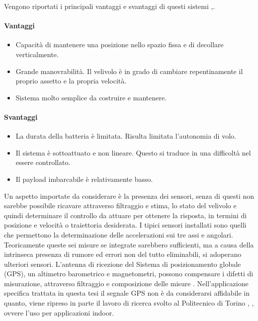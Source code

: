 Vengono riportati i principali vantaggi e svantaggi di questi sistemi \cite{DesTestCarm},\cite{irisquad}.
\paragraph{Vantaggi}
\begin{itemize}
	\item Capacità di mantenere una posizione nello spazio fissa e di decollare verticalmente.
	\item Grande manovrabilità. Il velivolo è in grado di cambiare repentinamente il proprio assetto e la propria velocità.
	\item Sistema molto semplice da costruire e mantenere.
\end{itemize}
\paragraph{Svantaggi}
\begin{itemize}
	\item La durata della batteria è limitata. Risulta limitata l'autonomia di volo.
	\item Il sistema è sottoattuato e non lineare. Questo si traduce in una difficoltà nel essere controllato.
	\item Il payload imbarcabile è relativamente basso.
\end{itemize}

Un aspetto importate da considerare è la presenza dei sensori, senza di questi non sarebbe possibile ricavare attraverso filtraggio e stima, lo stato del velivolo e quindi determinare il controllo da attuare per ottenere la risposta, in termini di posizione e velocità o traiettoria desiderata. I tipici sensori installati sono quelli che permettono la determinazione delle accelerazioni sui tre assi e angolari. Teoricamente queste sei misure se integrate sarebbero sufficienti, ma a causa della intrinseca presenza di rumore ed errori non del tutto eliminabili, si adoperano ulteriori sensori. L'antenna di ricezione del Sistema di posizionamento globale (GPS), un altimetro barometrico e magnetometri, possono compensare i difetti di misurazione, attraverso filtraggio e composizione delle misure \cite{KoksalN2018ALQA}. Nell'applicazione specifica trattata in questa tesi il segnale GPS non è da considerarsi affidabile in quanto, viene ripreso in parte il lavoro di ricerca svolto al Politecnico di Torino \cite{DesTestCarm}, \cite{baseTesi}, ovvere l'uso per applicazioni indoor.

